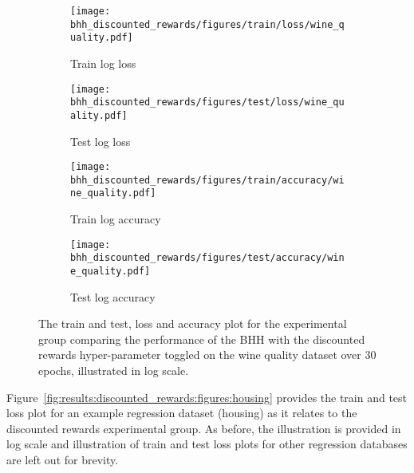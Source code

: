 \begin{figure}[H]
	\begin{subfigure}{0.5\textwidth}
		\centering
		\texttt{[image: bhh\_discounted\_rewards/figures/train/loss/wine\_quality.pdf]}
		\caption{Train log loss}
		\label{fig:results:discounted_rewards:figures:loss:train:wine_quality}
	\end{subfigure}
	\begin{subfigure}{0.5\textwidth}
		\centering
		\texttt{[image: bhh\_discounted\_rewards/figures/test/loss/wine\_quality.pdf]}
		\caption{Test log loss}
		\label{fig:results:discounted_rewards:figures:loss:test:wine_quality}
	\end{subfigure}
	\par\bigskip
	\begin{subfigure}{0.5\textwidth}
		\centering
		\texttt{[image: bhh\_discounted\_rewards/figures/train/accuracy/wine\_quality.pdf]}
		\caption{Train log accuracy}
		\label{fig:results:discounted_rewards:figures:accuracy:train:wine_quality}
	\end{subfigure}
	\begin{subfigure}{0.5\textwidth}
		\centering
		\texttt{[image: bhh\_discounted\_rewards/figures/test/accuracy/wine\_quality.pdf]}
		\caption{Test log accuracy}
		\label{fig:results:discounted_rewards:figures:accuracy:test:wine_quality}
	\end{subfigure}
	\par\bigskip
	\caption{The train and test, loss and accuracy plot for the experimental group comparing the performance of the \acs{BHH} with the discounted rewards hyper-parameter toggled on the wine quality dataset over 30 epochs, illustrated in log scale.}
	\label{fig:results:discounted_rewards:figures:wine_quality}
\end{figure}

Figure~\ref{fig:results:discounted_rewards:figures:housing} provides the train and test loss plot for an example regression dataset (housing) as it relates to the discounted rewards experimental group. As before, the illustration is provided in log scale and illustration of train and test loss plots for other regression databases are left out for brevity.

